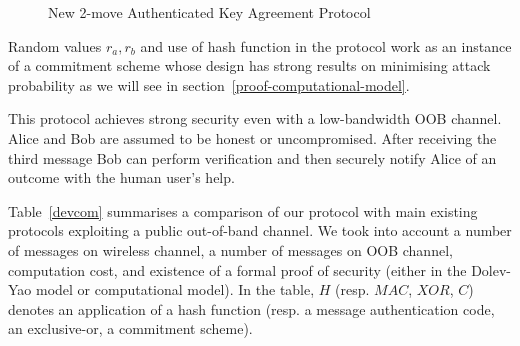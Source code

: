 \begin{figure}[b]
\begin{center}
\end{center}
\caption{New 2-move Authenticated Key Agreement Protocol} 
\label{improved-wong-stajano-protocol}
\end{figure}

Random values $r_a, r_b$ and use of hash function in the protocol work as an instance of a commitment scheme whose design has strong results on minimising attack probability as we will see in section~\ref{proof-computational-model}. 

This protocol achieves strong security even with a low-bandwidth OOB channel. Alice and Bob are assumed to be honest or uncompromised. After receiving the third message Bob can perform verification and then securely notify Alice of an outcome with the human user's help. 

Table~\ref{devcom} summarises a comparison of our protocol with main existing protocols exploiting a public out-of-band channel. We took into account a number of messages on wireless channel, a number of messages on OOB channel, computation cost, and existence of a formal proof of security (either in the Dolev-Yao model or computational model). In the table, $H$ (resp. $MAC$, $XOR$, $C$) denotes an application of a hash function (resp. a message authentication code, an exclusive-or, a commitment scheme).


